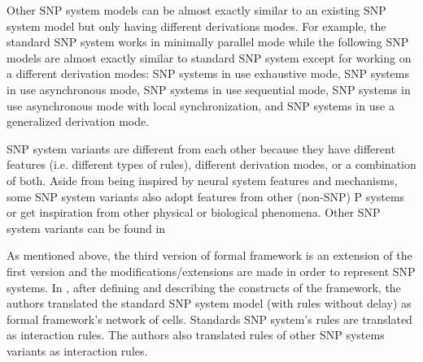 \documentclass[a4paper]{article}
\theoremstyle{definition}
\begin{document}
Other SNP system models can be almost exactly similar to an existing SNP system model but only 
having different derivations modes. For example, the standard SNP system works in minimally parallel
mode while the following SNP models are almost exactly similar to standard SNP system except for 
working on a different derivation modes:  SNP systems in \cite{ionescu-2007-exhaustive} use 
exhaustive mode, SNP systems in \cite{cavaliere-2009-asynchronous} use asynchronous mode, SNP 
systems in \cite{ibarra-2009-min-max-sequential} use sequential mode, SNP systems in 
\cite{song-2013-local-sync} use asynchronous mode with local synchronization, and SNP systems in                                 
\cite{zhang-2014-general-rule-use,jiang-2019-improved-usnp-general-rule-use} use a generalized       
derivation mode.

SNP system variants are different from each other because they have different features (i.e. 
different types of rules), different derivation modes, or a combination of both. Aside from being 
inspired by neural system features and mechanisms, some SNP system variants also adopt features from 
other (non-SNP) P systems or get inspiration from other physical or biological phenomena. Other 
SNP system variants can be found in                                                                                      
\cite{chen-2008-snp-e,alhazov-2006-esnp,chen-2007-axon-p,pan-2009-anti-spikes,song-2014-rules-on-synapses,metta-2014-cooperating-rules,wu-2016-cell-like,song-2016-request-rules,pan-2017-communication-on-request,song-2018-colored-spikes}  

As mentioned above, the third version of formal framework \cite{verlan-2020-ff-3} is an extension of 
the first version and the modifications/extensions are made in order to represent SNP systems. In 
\cite{verlan-2020-ff-3}, after defining and describing the constructs of the framework, the authors 
translated the standard SNP system model (with rules without delay) as formal framework's network of 
cells. Standards SNP system's rules are translated as interaction rules. The authors also translated
 rules of other SNP systems variants
\cite{chen-2008-snp-e,pan-2012-weighted-synapses,alhazov-2006-esnp,peng-2017-multiple-channels,pan-2012-astrocytes} 
as interaction rules.  

\end{document}
